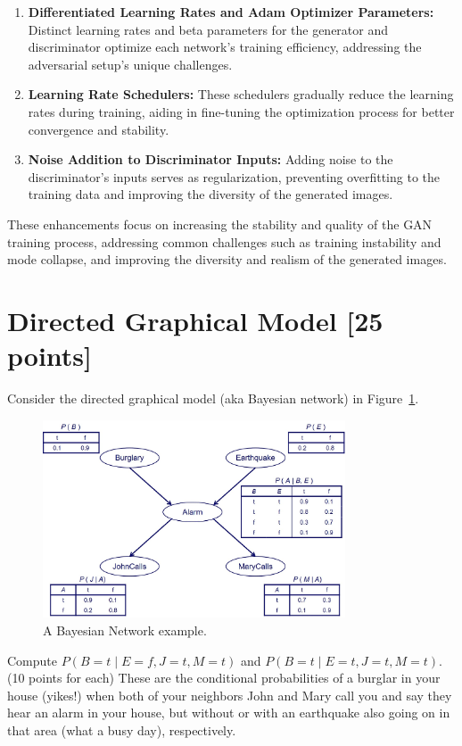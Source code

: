 \documentclass[a4paper]{article}
\theoremstyle{definition}
\newenvironment{soln}{
	\leavevmode\color{blue}\ignorespaces
}{}
\begin{document}
\begin{enumerate} [label=(\alph*)]
\begin{soln}
\begin{enumerate}
				\item \textbf{Differentiated Learning Rates and Adam Optimizer Parameters:} Distinct learning rates and beta parameters for the generator and discriminator optimize each network's training efficiency, addressing the adversarial setup's unique challenges.
			
				\item \textbf{Learning Rate Schedulers:} These schedulers gradually reduce the learning rates during training, aiding in fine-tuning the optimization process for better convergence and stability.
			
				\item \textbf{Noise Addition to Discriminator Inputs:} Adding noise to the discriminator's inputs serves as regularization, preventing overfitting to the training data and improving the diversity of the generated images.
			\end{enumerate}
			
			These enhancements focus on increasing the stability and quality of the GAN training process, addressing common challenges such as training instability and mode collapse, and improving the diversity and realism of the generated images.
		\end{soln}
	
	\end{enumerate}

\section{Directed Graphical Model [25 points]}
Consider the directed graphical model (aka Bayesian network) in Figure~\ref{fig:bn}.
\begin{figure}[H]
    \centering
    \includegraphics[width=0.8\textwidth]{BN.jpeg}
    \caption{A Bayesian Network example.}
    \label{fig:bn}
\end{figure}
Compute $P(B=t \mid E=f,J=t,M=t)$ and $P(B=t \mid E=t,J=t,M=t)$. (10 points for each) These are the conditional probabilities of a burglar in your house (yikes!) when both of your neighbors John and Mary call you and say they hear an alarm in your house, but without or with an earthquake also going on in that area (what a busy day), respectively.\\
\end{document}
